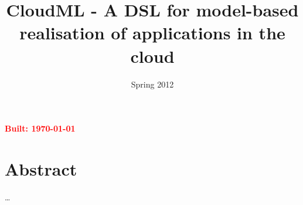 \documentclass{article}
\begin{document}
\title{CloudML - A DSL for model-based realisation of applications in the cloud}
\date{Spring 2012}

\maketitle
\textcolor{red}{\textbf{Built: \today}}

\section*{Abstract}
\ldots

\tableofcontents{}







\end{document}
